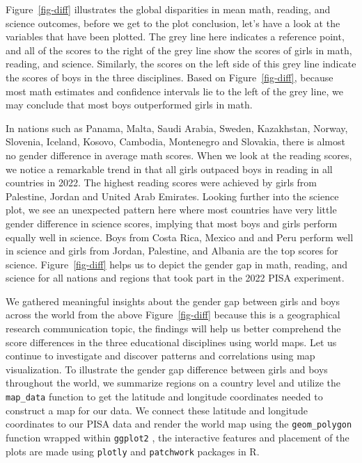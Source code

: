 \documentclass[
  11pt,
  a4paper,
]{article}
\begin{document}
Figure~\ref{fig-diff} illustrates the global disparities in mean math,
reading, and science outcomes, before we get to the plot conclusion,
let's have a look at the variables that have been plotted. The grey line
here indicates a reference point, and all of the scores to the right of
the grey line show the scores of girls in math, reading, and science.
Similarly, the scores on the left side of this grey line indicate the
scores of boys in the three disciplines. Based on Figure~\ref{fig-diff},
because most math estimates and confidence intervals lie to the left of
the grey line, we may conclude that most boys outperformed girls in
math.

In nations such as Panama, Malta, Saudi Arabia, Sweden, Kazakhstan,
Norway, Slovenia, Iceland, Kosovo, Cambodia, Montenegro and Slovakia,
there is almost no gender difference in average math scores. When we
look at the reading scores, we notice a remarkable trend in that all
girls outpaced boys in reading in all countries in 2022. The highest
reading scores were achieved by girls from Palestine, Jordan and United
Arab Emirates. Looking further into the science plot, we see an
unexpected pattern here where most countries have very little gender
difference in science scores, implying that most boys and girls perform
equally well in science. Boys from Costa Rica, Mexico and and Peru
perform well in science and girls from Jordan, Palestine, and Albania
are the top scores for science. Figure~\ref{fig-diff} helps us to depict
the gender gap in math, reading, and science for all nations and regions
that took part in the 2022 PISA experiment.

We gathered meaningful insights about the gender gap between girls and
boys across the world from the above Figure~\ref{fig-diff} because this
is a geographical research communication topic, the findings will help
us better comprehend the score differences in the three educational
disciplines using world maps. Let us continue to investigate and
discover patterns and correlations using map visualization. To
illustrate the gender gap difference between girls and boys throughout
the world, we summarize regions on a country level and utilize the
\texttt{map\_data} function to get the latitude and longitude
coordinates needed to construct a map for our data. We connect these
latitude and longitude coordinates to our PISA data and render the world
map using the \texttt{geom\_polygon} function wrapped within
\texttt{ggplot2} \autocite{ggplot2}, the interactive features and
placement of the plots are made using \texttt{plotly} \autocite{plotly}
and \texttt{patchwork} \autocite{patchwork} packages in R.
\end{document}
